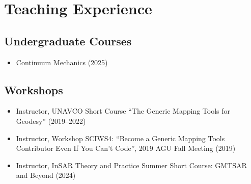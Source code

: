 \section{Teaching Experience}

\subsection{Undergraduate Courses}
\begin{itemize}
\item Continuum Mechanics (2025)
\end{itemize}

\subsection{Workshops}
\begin{itemize}
\item Instructor, UNAVCO Short Course ``The Generic Mapping Tools for Geodesy'' (2019--2022)
\item Instructor, Workshop SCIWS4: ``Become a Generic Mapping Tools Contributor Even If You Can't Code'', 2019 AGU Fall Meeting (2019)
\item Instructor, InSAR Theory and Practice Summer Short Course: GMTSAR and Beyond (2024)
\end{itemize}
